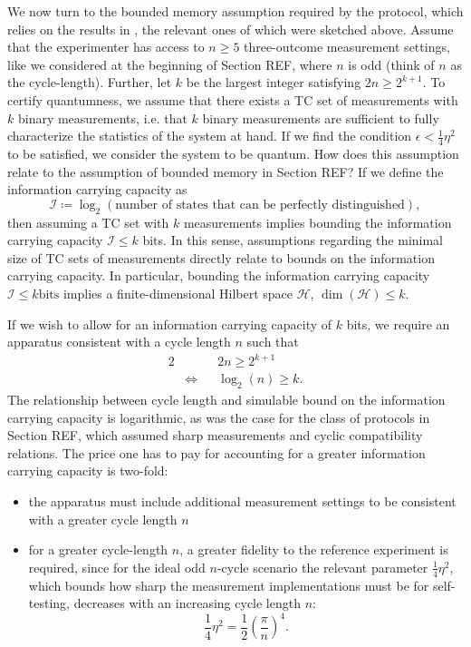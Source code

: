 We now turn to the bounded memory assumption required by the protocol, which relies on the results in \cite{Pusey2019a}, the relevant ones of which were sketched above. Assume that the experimenter has access to $n\geq 5$ three-outcome measurement settings, like we considered at the beginning of Section REF, where $n$ is odd (think of $n$ as the cycle-length). Further, let $k$ be the largest integer satisfying $2n\geq 2^{k+1}$. To certify quantumness, we assume that there exists a TC set of measurements with $k$ binary measurements, i.e. that $k$ binary measurements are sufficient to fully characterize the statistics of the system at hand. If we find the condition $\epsilon<\frac{1}{4}\eta^2$ to be satisfied, we consider the system to be quantum.  How does this assumption relate to the assumption of bounded memory in Section REF? If we define the information carrying capacity as 
\begin{equation}
\mathcal{I}\coloneqq \log_2(\text{number of states that can be perfectly distinguished}),
\end{equation}
then assuming a TC set with $k$ measurements implies bounding the information carrying capacity $\mathcal{I}\leq k$ bits. In this sense, assumptions regarding the minimal size of TC sets of measurements directly relate to bounds on the information carrying capacity. In particular, bounding the information carrying capacity $\mathcal{I}\leq k \text{bits}$ implies a finite-dimensional Hilbert space $\mathcal{H}$, $\operatorname{dim}(\mathcal{H})\leq k$.

If we wish to allow for an information carrying capacity of $k$ bits, we require an apparatus consistent with a cycle length $n$ such that
\begin{alignat}{2}
& && 2n\geq 2^{k+1} \\
& \iff && \log_2(n)\geq k.
\end{alignat}
The relationship between cycle length and simulable bound on the information carrying capacity is logarithmic, as was the case for the class of protocols in Section REF, which assumed sharp measurements and cyclic compatibility relations. The price one has to pay for accounting for a greater information carrying capacity is two-fold:
\begin{itemize}
\item the apparatus must include additional measurement settings to be consistent with a greater cycle length $n$
\item for a greater cycle-length $n$, a greater fidelity to the reference experiment is required, since for the ideal odd $n$-cycle scenario the relevant parameter $\frac{1}{4}\eta^2$, which bounds how sharp the measurement implementations must be for self-testing, decreases with an increasing cycle length $n$:
\begin{equation}
\frac{1}{4}\eta^2 = \frac{1}{2}(\frac{\pi}{n})^4.
\end{equation}
\end{itemize}

